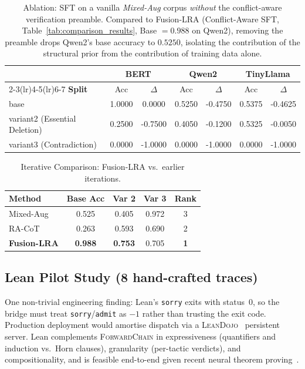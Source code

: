 \documentclass{article}
\begin{document}
\begin{table}[h]
\centering\small
\caption{Ablation: SFT on a vanilla \emph{Mixed-Aug} corpus \emph{without} the conflict-aware verification preamble. Compared to Fusion-LRA (Conflict-Aware SFT, Table~\ref{tab:comparison_results}, Base $=0.988$ on Qwen2), removing the preamble drops Qwen2's base accuracy to $0.5250$, isolating the contribution of the structural prior from the contribution of training data alone.}
\label{tab:stage1_results}
\begin{tabular}{lcccccc}
\toprule
& \multicolumn{2}{c}{\textbf{BERT}} & \multicolumn{2}{c}{\textbf{Qwen2}} & \multicolumn{2}{c}{\textbf{TinyLlama}} \\
\cmidrule(lr){2-3}\cmidrule(lr){4-5}\cmidrule(lr){6-7}
\textbf{Split} & Acc & $\Delta$ & Acc & $\Delta$ & Acc & $\Delta$ \\
\midrule
base                            & 1.0000 & 0.0000 & 0.5250 & -0.4750 & 0.5375 & -0.4625 \\
variant2 (Essential Deletion)   & 0.2500 & -0.7500 & 0.4050 & -0.1200 & 0.5325 & -0.0050 \\
variant3 (Contradiction)        & 0.0000 & -1.0000 & 0.0000 & -1.0000 & 0.0000 & -1.0000 \\
\bottomrule
\end{tabular}
\end{table}

\begin{table}[h]
\centering\small
\caption{Iterative Comparison: Fusion-LRA vs.\ earlier iterations.}
\label{tab:final_performance_comparison}
\begin{tabular}{lcccc}
\toprule
\textbf{Method} & \textbf{Base Acc} & \textbf{Var 2} & \textbf{Var 3} & \textbf{Rank} \\
\midrule
Mixed-Aug              & 0.525          & 0.405          & 0.972          & 3 \\
RA-CoT                 & 0.263          & 0.593          & 0.690          & 2 \\
\midrule
\textbf{Fusion-LRA}    & \textbf{0.988} & \textbf{0.753} & 0.705          & \textbf{1} \\
\bottomrule
\end{tabular}
\end{table}

\subsection{Lean Pilot Study (8 hand-crafted traces)}
\label{app:lean-pilot-note}
One non-trivial engineering finding: Lean's \texttt{sorry} exits with status~0, so the bridge must treat \texttt{sorry}/\texttt{admit} as $-1$ rather than trusting the exit code. Production deployment would amortise dispatch via a \textsc{LeanDojo}~\citep{yang2023leandojo} persistent server. Lean complements \textsc{ForwardChain} in expressiveness (quantifiers and induction vs.\ Horn clauses), granularity (per-tactic verdicts), and compositionality, and is feasible end-to-end given recent neural theorem proving~\citep{yang2023leandojo,polu2020gpt-f,alphaproof2024}.
\end{document}
